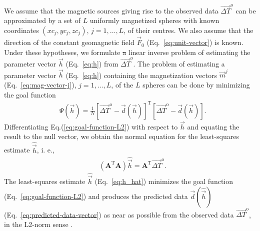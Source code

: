 \documentclass[journal abbreviation, npg]{copernicus}
\providecommand{\DIFadd}[1]{{\protect\color{blue}\uwave{#1}}} %
\providecommand{\DIFdel}[1]{{\protect\color{red}\sout{#1}}}                      %
\providecommand{\DIFaddbegin}{} %
\providecommand{\DIFaddend}{} %
\providecommand{\DIFdelbegin}{} %
\providecommand{\DIFdelend}{} %
\begin{document}
We assume that the magnetic sources giving rise to the observed data
$\vec{\Delta T}^\mathrm{o}$ can be approximated by a set of $L$ uniformly
magnetized spheres with known coordinates $(xc_{j}, yc_{j}, zc_{j})$, $j = 1,
\ldots, L$, of their centres. We also assume that the direction of the
constant geomagnetic field $\vec{F}_{0}$ (Eq.~\ref{eq:unit-vector}) is known.
Under these hypotheses, we formulate \DIFdelbegin \DIFdel{a }\DIFdelend \DIFaddbegin \DIFadd{an overdetermined }\DIFaddend linear inverse problem 
of estimating
the parameter vector $\vec{h}$ (Eq.~\ref{eq:h}) from $\vec{\Delta
T}^\mathrm{o}$. The problem of estimating a parameter vector $\vec{h}$
(Eq.~\ref{eq:h}) containing the magnetization vectors $\vec{m}^{j}$
(Eq.~\ref{eq:mag-vector-j}), $j = 1, \ldots, L$, of the $L$ spheres can be
done by minimizing the goal function
\begin{align}
 &
\Psi(\vec{h}) = \frac{1}{N}[\vec{\Delta T}^\mathrm{o} - \vec{d}(\vec{h})]^{\mathrm{T}}[\vec{\Delta T}^\mathrm{o} - \vec{d}(\vec{h})] .
\label{eq:goal-function-L2}
\end{align}
Differentiating Eq.\DIFaddbegin \DIFadd{~}\DIFaddend (\ref{eq:goal-function-L2}) with respect to
$\vec{h}$ and equating the result to the null vector, we obtain the
normal equation for the least-squares estimate $\hat{\vec{h}}$, i. e.,
\begin{align}
 &
(\mathbf{A}^{\mathrm{T}}\mathbf{A})  \hat{\vec{h}} = \mathbf{A}^{\mathrm{T}}  \vec{\Delta T}^\mathrm{o} .
\label{eq:h_hat}
\end{align}
The least-squares estimate $\hat{\vec{h}}$ (Eq.~\ref{eq:h_hat}) minimizes the
goal function (Eq.~\ref{eq:goal-function-L2}) and produces the predicted data
$\vec{d}(\hat{\vec{h}})$ (Eq.~\ref{eq:predicted-data-vector}) as near as
possible from the observed data $\vec{\Delta T}^\mathrm{o}$, in the L2-norm
sense \citep{bard1973,twomey1977,menke1989,aster-etal2005}.
\end{document}
